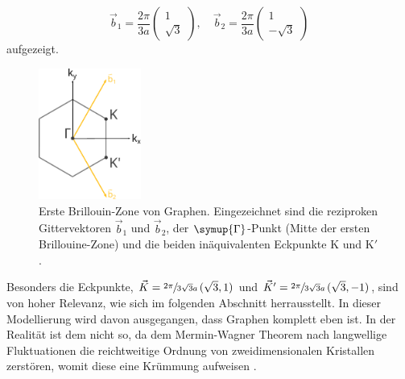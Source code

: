 \begin{equation*}
    \vec{b}_1 = \frac{2\pi}{3a} \begin{pmatrix}  1\\[4pt]   \sqrt{3}  \end{pmatrix}, \quad
    \vec{b}_2 = \frac{2\pi}{3a} \begin{pmatrix}  1\\[4pt] - \sqrt{3} \end{pmatrix}       
\end{equation*}    
aufgezeigt.
\begin{figure}
    \centering
    \includegraphics[width = 0.3\textwidth]{Plots/graphene_first_brillouine_zone.pdf}
    \caption{Erste Brillouin-Zone von Graphen.
    Eingezeichnet sind die reziproken Gittervektoren $\vec{b}_1$ und $\vec{b}_2$,
    der $\symup{\Gamma}$-Punkt (Mitte der ersten Brillouine-Zone) und die beiden inäquivalenten
    Eckpunkte K und K$'$.}
    \label{fig:first-brillouine-zone}
\end{figure}
Besonders die Eckpunkte, $\vec{K} = \sfrac{2\pi}{3\sqrt{3}a} \, (\sqrt{3},1)$ %
und $\vec{K}' = \sfrac{2\pi}{3\sqrt{3}a} \, (\sqrt{3},-1)$, sind von hoher Relevanz, wie sich im folgenden Abschnitt herrausstellt.
In dieser Modellierung wird davon ausgegangen, dass Graphen komplett eben ist. 
In der Realität ist dem nicht so, da dem Mermin-Wagner Theorem\cite{PhysRev.176.250} nach langwellige Fluktuationen die reichtweitige Ordnung von zweidimensionalen Kristallen zerstören, womit
diese eine Krümmung aufweisen \cite{Fasolino2007}.
\FloatBarrier
\newpage
